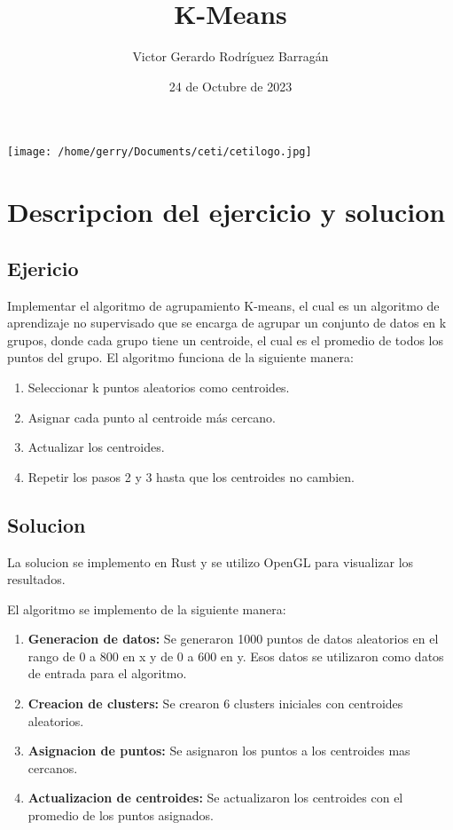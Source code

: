 \documentclass{article}
\title{K-Means}
\author{Victor Gerardo Rodríguez Barragán}
\date{24 de Octubre de 2023}
\begin{document}
\maketitle
\begin{center}
    \texttt{[image: /home/gerry/Documents/ceti/cetilogo.jpg]}
\end{center}

\newpage
\justify
\section{Descripcion del ejercicio y solucion}
\subsection{Ejericio}
Implementar el algoritmo de agrupamiento K-means, el cual es un algoritmo de aprendizaje no supervisado
que se encarga de agrupar un conjunto de datos en k grupos, donde cada grupo tiene un centroide,
el cual es el promedio de todos los puntos del grupo. El algoritmo funciona de la siguiente manera:
\begin{enumerate}
    \item Seleccionar k puntos aleatorios como centroides.
    \item Asignar cada punto al centroide más cercano.
    \item Actualizar los centroides.
    \item Repetir los pasos 2 y 3 hasta que los centroides no cambien.
\end{enumerate}
\subsection{Solucion}
La solucion se implemento en Rust y se utilizo OpenGL para visualizar los resultados.

El algoritmo se implemento de la siguiente manera:
\begin{enumerate}
    \item \textbf{Generacion de datos:} Se generaron 1000 puntos de datos aleatorios en el rango de 0 a 800 en x y de 0 a 600 en y. Esos
        datos se utilizaron como datos de entrada para el algoritmo.
    \item \textbf{Creacion de clusters:} Se crearon 6 clusters iniciales con centroides aleatorios.
    \item \textbf{Asignacion de puntos:} Se asignaron los puntos a los centroides mas cercanos.
    \item \textbf{Actualizacion de centroides:} Se actualizaron los centroides con el promedio de los puntos asignados.
\end{enumerate}
\end{document}

